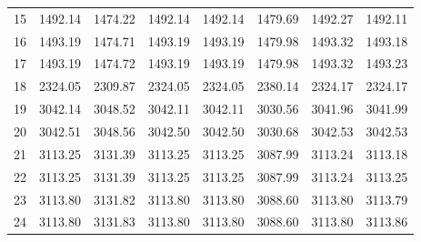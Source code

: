 \documentclass[10pt,oneside]{article}
\begin{document}
\begin{table}[h!]
\begin{tabular}{cccccccc}
15 &   1492.14 & 1474.22 & 1492.14 &    1492.14 &      1479.69 & 1492.27 &   1492.11 \\
16 &   1493.19 & 1474.71 & 1493.19 &    1493.19 &      1479.98 & 1493.32 &   1493.18 \\
17 &   1493.19 & 1474.72 & 1493.19 &    1493.19 &      1479.98 & 1493.32 &   1493.23 \\
18 &   2324.05 & 2309.87 & 2324.05 &    2324.05 &      2380.14 & 2324.17 &   2324.17 \\
19 &   3042.14 & 3048.52 & 3042.11 &    3042.11 &      3030.56 & 3041.96 &   3041.99 \\
20 &   3042.51 & 3048.56 & 3042.50 &    3042.50 &      3030.68 & 3042.53 &   3042.53 \\
21 &   3113.25 & 3131.39 & 3113.25 &    3113.25 &      3087.99 & 3113.24 &   3113.18 \\
22 &   3113.25 & 3131.39 & 3113.25 &    3113.25 &      3087.99 & 3113.24 &   3113.25 \\
23 &   3113.80 & 3131.82 & 3113.80 &    3113.80 &      3088.60 & 3113.80 &   3113.79 \\
24 &   3113.80 & 3131.83 & 3113.80 &    3113.80 &      3088.60 & 3113.80 &   3113.86 \\
\bottomrule
\end{tabular}
\end{table}
\end{document}
